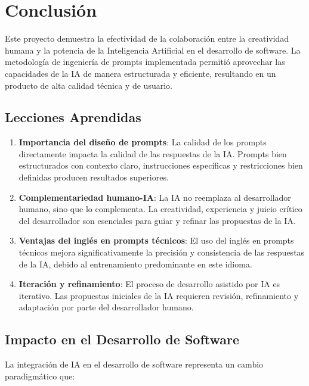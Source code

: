 \documentclass[12pt,a4paper]{article}
\begin{document}
\section{Conclusión}

Este proyecto demuestra la efectividad de la colaboración entre la creatividad humana y la potencia de la Inteligencia Artificial en el desarrollo de software. La metodología de ingeniería de prompts implementada permitió aprovechar las capacidades de la IA de manera estructurada y eficiente, resultando en un producto de alta calidad técnica y de usuario.

\subsection{Lecciones Aprendidas}

\begin{enumerate}
    \item \textbf{Importancia del diseño de prompts}: La calidad de los prompts directamente impacta la calidad de las respuestas de la IA. Prompts bien estructurados con contexto claro, instrucciones específicas y restricciones bien definidas producen resultados superiores.
    
    \item \textbf{Complementariedad humano-IA}: La IA no reemplaza al desarrollador humano, sino que lo complementa. La creatividad, experiencia y juicio crítico del desarrollador son esenciales para guiar y refinar las propuestas de la IA.
    
    \item \textbf{Ventajas del inglés en prompts técnicos}: El uso del inglés en prompts técnicos mejora significativamente la precisión y consistencia de las respuestas de la IA, debido al entrenamiento predominante en este idioma.
    
    \item \textbf{Iteración y refinamiento}: El proceso de desarrollo asistido por IA es iterativo. Las propuestas iniciales de la IA requieren revisión, refinamiento y adaptación por parte del desarrollador humano.
\end{enumerate}

\subsection{Impacto en el Desarrollo de Software}

La integración de IA en el desarrollo de software representa un cambio paradigmático que:
\end{document}
